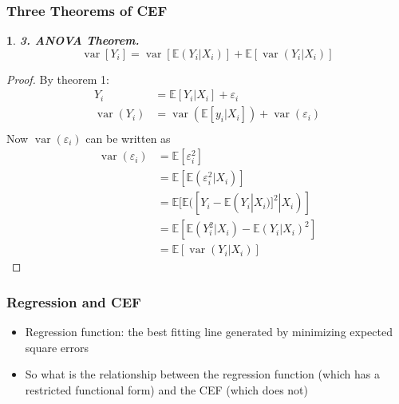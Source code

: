 \documentclass{beamer}
\theoremstyle{plain}
\newtheorem*{customthm}{} %
\newcommand{\customtheorem}[2]{
	\begin{customthm}
		\textbf{#1.} #2
	\end{customthm}
}
\begin{document}
\begin{frame}
	\frametitle{Three Theorems of CEF}
%	

\customtheorem{3. ANOVA Theorem}{$$\operatorname{var}[Y_i] = \operatorname{var}[\mathbb E(Y_i|X_i)] + \mathbb E [\operatorname{var}(Y_i | X_i)] $$}
	
	\begin{proof}
		By theorem 1:
		\begin{align*}
			Y_i &= \mathbb E[Y_i | X_i]+ \varepsilon_i\\
			\operatorname{var}(Y_i) &= \operatorname{var} (\mathbb E[y_i|X_i]) + \operatorname{var}(\varepsilon_i)\\
		\end{align*}
		Now $\operatorname{var}(\varepsilon_i)$ can be written as
		\begin{align*}
			\operatorname{var}(\varepsilon_i) &= \mathbb E[\varepsilon_i^2]\\
			&= \mathbb E[\mathbb E(\varepsilon_i^2|X_i)]\\
			&= \mathbb E[\mathbb{E}([Y_i - \mathbb E(Y_i|X_i)]^2|X_i)]\\
			&= \mathbb E[ \mathbb E(Y_i^2 | X_i) - \mathbb E(Y_i|X_i)^2]\\
			&= \mathbb E[\operatorname{var}(Y_i|X_i)]
		\end{align*}
	\end{proof}
\end{frame}


\begin{frame}
	\frametitle{Regression and CEF}
	\begin{itemize}
		\item Regression function: the best fitting line generated by minimizing expected square errors
		\item So what is the relationship between the regression function (which has a restricted functional form) and the CEF (which does not)
	\end{itemize}
\end{frame}
\end{document}
